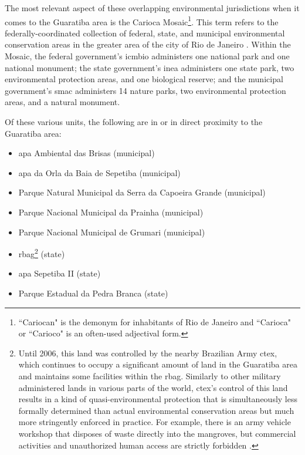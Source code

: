 The most relevant aspect of these overlapping environmental jurisdictions when it comes to the Guaratiba area is the Carioca Mosaic\footnote{``Cariocan" is the demonym for inhabitants of Rio de Janeiro and ``Carioca" or ``Carioco" is an often-used adjectival form.}. This term refers to the federally-coordinated collection of federal, state, and municipal environmental conservation areas in the greater area of the city of Rio de Janeiro \cite{teixeiraPORTARIANo2452011}. Within the Mosaic, the federal government's \ac{icmbio} administers one national park and one national monument; the state government's \ac{inea} administers one state park, two environmental protection areas, and one biological reserve; and the municipal government's \ac{smac} administers 14 nature parks, two environmental protection areas, and a natural monument.

Of these various units, the following are in or in direct proximity to the Guaratiba area:

{
\begin{itemize}
	\item \ac{apa} Ambiental das Brisas (municipal)
	\item \ac{apa} da Orla da Baia de Sepetiba (municipal) 
	\item Parque Natural Municipal da Serra da Capoeira Grande (municipal)
	\item Parque Nacional Municipal da Prainha (municipal)
	\item Parque Nacional Municipal de Grumari (municipal)
	\item \ac{rbag}\footnote{Until 2006, this land was controlled by the nearby Brazilian Army \ac{ctex}, which continues to occupy a significant amount of land in the Guaratiba area and maintains some facilities within the \ac{rbag}. Similarly to other military administered lands in various parts of the world, \ac{ctex}'s control of this land results in a kind of quasi-environmental protection that is simultaneously less formally determined than actual environmental conservation areas but much more stringently enforced in practice. For example, there is an army vehicle workshop that disposes of waste directly into the mangroves, but commercial activities and unauthorized human access are strictly forbidden \cite{herzogGuaratibaVerdeSubsidios2009}.} (state)
	\item \ac{apa} Sepetiba II (state)
	\item Parque Estadual da Pedra Branca (state)
\end{itemize}}

